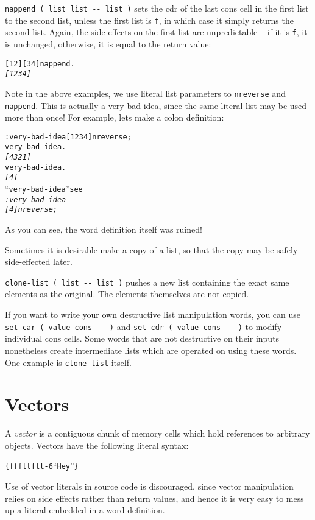 \documentclass[english]{article}
\begin{document}
\texttt{nappend ( list list -{}- list )} sets the cdr of the last
cons cell in the first list to the second list, unless the first list
is \texttt{f}, in which case it simply returns the second list. Again,
the side effects on the first list are unpredictable -- if it is \texttt{f},
it is unchanged, otherwise, it is equal to the return value:

\begin{alltt}
{[} 1 2 {]} {[} 3 4 {]} nappend .
\emph{{[} 1 2 3 4 {]}}
\end{alltt}
Note in the above examples, we use literal list parameters to \texttt{nreverse}
and \texttt{nappend}. This is actually a very bad idea, since the same literal
list may be used more than once! For example, lets make a colon definition:

\begin{alltt}
: very-bad-idea {[} 1 2 3 4 {]} nreverse ;
very-bad-idea .
\emph{{[} 4 3 2 1 {]}}
very-bad-idea .
\emph{{[} 4 {]}}
{}``very-bad-idea'' see
\emph{: very-bad-idea}
 \emph{   {[} 4 {]} nreverse ;}
\end{alltt}
As you can see, the word definition itself was ruined!

Sometimes it is desirable make a copy of a list, so that the copy
may be safely side-effected later.

\texttt{clone-list ( list -{}- list )} pushes a new list containing
the exact same elements as the original. The elements themselves are
not copied.

If you want to write your own destructive list manipulation words,
you can use \texttt{set-car ( value cons -{}- )} and \texttt{set-cdr
( value cons -{}- )} to modify individual cons cells. Some words that
are not destructive on their inputs nonetheless create intermediate
lists which are operated on using these words. One example is \texttt{clone-list}
itself.


\section{\label{sub:Vectors}Vectors}

A \emph{vector} is a contiguous chunk of memory cells which hold references to arbitrary
objects. Vectors have the following literal syntax:

\begin{alltt}
\{ f f f t t f t t -6 {}``Hey'' \}
\end{alltt}
Use of vector literals in source code is discouraged, since vector
manipulation relies on side effects rather than return values, and
hence it is very easy to mess up a literal embedded in a word definition.
\end{document}
